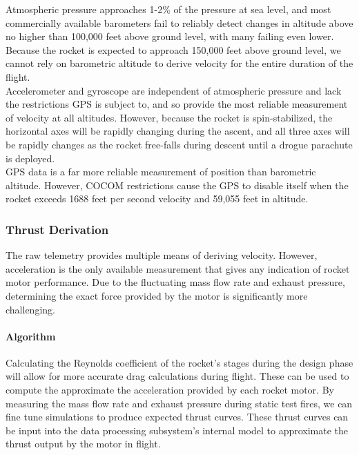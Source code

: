 \documentclass[journal,10pt,onecolumn,compsoc]{IEEEtran}
\begin{document}
				\noindent Atmospheric pressure approaches 1-2\% of the pressure at sea level, and most commercially available barometers fail to reliably detect changes in altitude above no higher than 100,000 feet above ground level, with many failing even lower.
				Because the rocket is expected to approach 150,000 feet above ground level, we cannot rely on barometric altitude to derive velocity for the entire duration of the flight.\\

				\noindent Accelerometer and gyroscope are independent of atmospheric pressure and lack the restrictions GPS is subject to, and so provide the most reliable measurement of velocity at all altitudes.
				However, because the rocket is spin-stabilized, the horizontal axes will be rapidly changing during the ascent, and all three axes will be rapidly changes as the rocket free-falls during descent until a drogue parachute is deployed.\\

				\noindent GPS data is a far more reliable measurement of position than barometric altitude.
				However, COCOM restrictions cause the GPS to disable itself when the rocket exceeds 1688 feet per second velocity and 59,055 feet in altitude.
		
		\subsubsection{Thrust Derivation}
			\noindent The raw telemetry provides multiple means of deriving velocity.
			However, acceleration is the only available measurement that gives any indication of rocket motor performance.
			Due to the fluctuating mass flow rate and exhaust pressure, determining the exact force provided by the motor is significantly more challenging.
			
			\paragraph{Algorithm}
				\noindent Calculating the Reynolds coefficient of the rocket's stages during the design phase will allow for more accurate drag calculations during flight.
				These can be used to compute the approximate the acceleration provided by each rocket motor.
				By measuring the mass flow rate and exhaust pressure during static test fires, we can fine tune simulations to produce expected thrust curves.
				These thrust curves can be input into the data processing subsystem's internal model to approximate the thrust output by the motor in flight.
			
\end{document}
